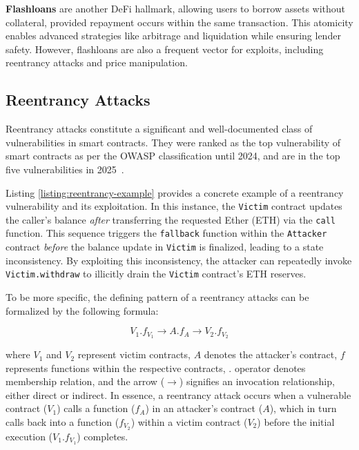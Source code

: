 \textbf{Flashloans} are another DeFi hallmark, allowing users to borrow assets without collateral, provided repayment occurs within the same transaction. This atomicity enables advanced strategies like arbitrage and liquidation while ensuring lender safety. However, flashloans are also a frequent vector for exploits, including reentrancy attacks and price manipulation.



\subsection{Reentrancy Attacks}
\label{background:reentrancy-attacks}

Reentrancy attacks constitute a significant and well-documented class of vulnerabilities in smart contracts. They were ranked as the top vulnerability of smart contracts as per the OWASP classification until 2024, and are in the top five vulnerabilities in 2025~\cite{top-smart-contract-attacks, top-smart-contract-attacks-2025}.

Listing \ref{listing:reentrancy-example} provides a concrete example of a reentrancy vulnerability and its exploitation. In this instance, the \lstinline{Victim} contract updates the caller's balance \textit{after} transferring the requested Ether (ETH) via the \lstinline{call} function.  This sequence triggers the \lstinline{fallback} function within the \lstinline{Attacker} contract \textit{before} the balance update in \lstinline{Victim} is finalized, leading to a state inconsistency. By exploiting this inconsistency, the attacker can repeatedly invoke \lstinline{Victim.withdraw} to illicitly drain the \lstinline{Victim} contract's ETH reserves.

To be more specific, the defining pattern of a reentrancy attacks can be formalized by the following formula:

\vspace{-1.5mm}
\begin{equation}
V_1.f_{V_1} \rightarrow A.f_{A} \rightarrow V_2.f_{V_2} \label{def}
\end{equation}

where $V_1$ and $V_2$ represent victim contracts, $A$ denotes the attacker's contract, $f$ represents functions within the respective contracts, $.$ operator denotes membership relation, and the arrow ($\rightarrow$) signifies an invocation relationship, either direct or indirect. In essence, a reentrancy attack occurs when a vulnerable contract ($V_1$) calls a function ($f_A$) in an attacker's contract ($A$), which in turn calls back into a function ($f_{V_2}$) within a victim contract ($V_2$) before the initial execution ($V_1.f_{V_1}$) completes.

